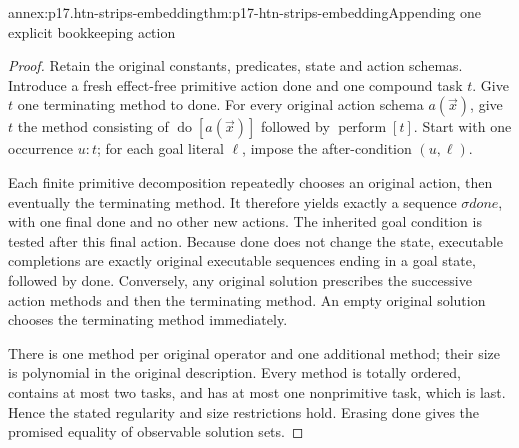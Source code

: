 \begin{annexitem}{annex:p17.htn-strips-embedding}{thm:p17-htn-strips-embedding}{Appending one explicit bookkeeping action}
\begin{proof}
Retain the original constants, predicates, state and action schemas. Introduce
a fresh effect-free primitive action done and one compound task \(t\).
Give \(t\) one terminating method to done. For every original action schema
\(a(\vec x)\), give \(t\) the method consisting of
\(\operatorname{do}[a(\vec x)]\) followed by \(\operatorname{perform}[t]\).
Start with one occurrence \(u:t\); for each goal literal \(\ell\), impose
the after-condition \((u,\ell)\).

Each finite primitive decomposition repeatedly chooses an original action,
then eventually the terminating method. It therefore yields exactly a
sequence \(\sigma\mathit{done}\), with one final done and no other new
actions. The inherited goal condition is tested after this final action.
Because done does not change the state, executable completions are exactly
original executable sequences ending in a goal state, followed by done.
Conversely, any original solution prescribes the successive action methods
and then the terminating method. An empty original solution chooses the
terminating method immediately.

There is one method per original operator and one additional method; their
size is polynomial in the original description. Every method is totally
ordered, contains at most two tasks, and has at most one nonprimitive task,
which is last. Hence the stated regularity and size restrictions hold.
Erasing done gives the promised equality of observable solution sets.
\end{proof}
\end{annexitem}

